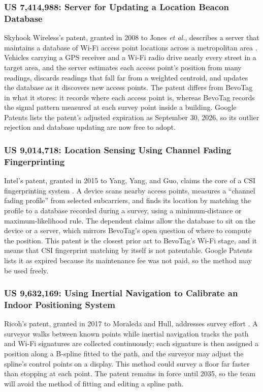 \documentclass[12pt,letterpaper]{article}
\begin{document}
\subsubsection{US 7,414,988: Server for Updating a Location Beacon Database}
Skyhook Wireless's patent, granted in 2008 to Jones \emph{et al.}, describes a server that
maintains a database of Wi-Fi access point locations across a metropolitan area \cite{skyhook}.
Vehicles carrying a GPS receiver and a Wi-Fi radio drive nearly every street in a target area, and
the server estimates each access point's position from many readings, discards readings that fall
far from a weighted centroid, and updates the database as it discovers new access points. The
patent differs from BevoTag in what it stores: it records where each access point is, whereas
BevoTag records the signal pattern measured at each survey point inside a building. Google Patents
lists the patent's adjusted expiration as September 30, 2026, so its outlier rejection and
database updating are now free to adopt.

\subsubsection{US 9,014,718: Location Sensing Using Channel Fading Fingerprinting}
Intel's patent, granted in 2015 to Yang, Yang, and
Guo, claims the core of a CSI fingerprinting system \cite{intel}. A device scans nearby access
points, measures a ``channel fading profile'' from selected subcarriers, and finds its location by
matching the profile to a database recorded during a survey, using a minimum-distance or
maximum-likelihood rule. The dependent claims allow the database to sit on the device or a server,
which mirrors BevoTag's open question of where to compute the position. This patent is the closest
prior art to BevoTag's Wi-Fi stage, and it means that CSI fingerprint matching by itself is not
patentable. Google Patents lists it as expired because its maintenance fee was not paid, so the
method may be used freely.

\subsubsection{US 9,632,169: Using Inertial Navigation to Calibrate an Indoor Positioning System}
Ricoh's patent, granted in 2017 to Moraleda and Hull, addresses survey effort \cite{ricoh}. A
surveyor walks between known points while inertial navigation tracks the path and Wi-Fi
signatures are collected continuously; each signature is then assigned a position along a B-spline
fitted to the path, and the surveyor may adjust the spline's control points on a display. This
method could survey a floor far faster than stopping at each point. The patent remains in force
until 2035, so the team will avoid the method of fitting and editing a spline path.
\end{document}
